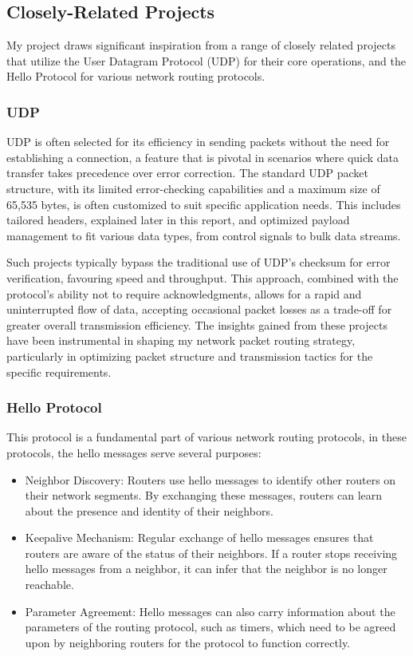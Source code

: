 \documentclass{article}
\begin{document}
\subsection{Closely-Related Projects}

My project draws significant inspiration from a range of closely related projects that utilize the User Datagram Protocol (UDP) for their core operations, and the Hello Protocol for various network routing protocols. 

\subsubsection*{UDP}
UDP is often selected for its efficiency in sending packets without the need for establishing a connection, a feature that is pivotal in scenarios where quick data transfer takes precedence over error correction. The standard UDP packet structure, with its limited error-checking capabilities and a maximum size of 65,535 bytes, is often customized to suit specific application needs. This includes tailored headers, explained later in this report, and optimized payload management to fit various data types, from control signals to bulk data streams.

Such projects typically bypass the traditional use of UDP's checksum for error verification, favouring speed and throughput. This approach, combined with the protocol's ability not to require acknowledgments, allows for a rapid and uninterrupted flow of data, accepting occasional packet losses as a trade-off for greater overall transmission efficiency. The insights gained from these projects have been instrumental in shaping my network packet routing strategy, particularly in optimizing packet structure and transmission tactics for the specific requirements.

\subsubsection*{Hello Protocol}

This protocol is a fundamental part of various network routing protocols, in these protocols, the hello messages serve several purposes:
\begin{itemize}
	\item Neighbor Discovery: Routers use hello messages to identify other routers on their network segments. By exchanging these messages, routers can learn about the presence and identity of their neighbors.


	\item Keepalive Mechanism: Regular exchange of hello messages ensures that routers are aware of the status of their neighbors. If a router stops receiving hello messages from a neighbor, it can infer that the neighbor is no longer reachable.


	\item Parameter Agreement: Hello messages can also carry information about the parameters of the routing protocol, such as timers, which need to be agreed upon by neighboring routers for the protocol to function correctly.
\end{itemize}
\end{document}

